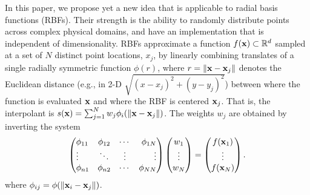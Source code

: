 \documentclass[10pt,conference,compsocconf]{IEEEtran}
\begin{document}

In this paper, we propose yet a new idea that is applicable to radial basis functions (RBFs). Their strength is the ability to randomly distribute points across complex physical domains, and have an implementation that is independent of dimensionality. RBFs approximate a function $f({\bf x})\subset \mathbb{R}^d$ sampled at a set of $N$ distinct point locations, $x_j$, by linearly combining translates of a single radially symmetric function $\phi(r)$, where  $r = \|{\bf x}-{\bf x}_{j}\|$ denotes the Euclidean distance (e.g., in 2-D $\sqrt{(x-x_j)^2+(y-y_j)^2}$) between where the function is evaluated ${\bf x}$ and where the RBF is centered ${\bf x}_{j}$. That is, the interpolant is $s({\bf x}) =  \sum_{j=1}^{N} w_j \phi_i(\|{\bf x}-{\bf x}_{j}\|)$. The weights $w_j$ are obtained by inverting the system
\begin{equation}
\parray{lccr}{
\phi_{11} & \phi_{12} & \cdots & \phi_{1N} \\
\vdots & \ddots & \vdots & \vdots \\
\phi_{n1} & \phi_{n2} & \cdots & \phi_{NN} 
}
\parray{c}{ w_{1} \\ \vdots \\ w_{N} }
=
\parray{c}{ f(\xvec_1) \\ \vdots\\ f(\xvec_N) }. 
\label{eq:rbf}
\end{equation}
where $\phi_{ij} = \phi(\|{\bf x}_i-{\bf x}_j\|)$. 
\end{document}
